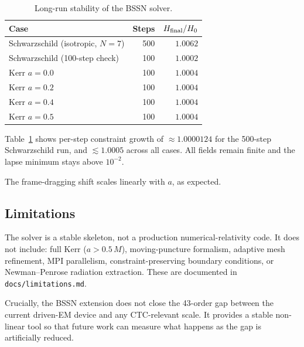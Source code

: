 \begin{table}[h]
\centering
\caption{Long-run stability of the BSSN solver.}
\label{tab:bssn}
\begin{tabular}{lrr}
\hline
Case & Steps & $H_{\rm final}/H_0$ \\
\hline
Schwarzschild (isotropic, $N{=}7$) & 500 & $1.0062$ \\
Schwarzschild (100-step check)      & 100 & $1.0002$ \\
Kerr $a{=}0.0$                       & 100 & $1.0004$ \\
Kerr $a{=}0.2$                       & 100 & $1.0004$ \\
Kerr $a{=}0.4$                       & 100 & $1.0004$ \\
Kerr $a{=}0.5$                       & 100 & $1.0004$ \\
\hline
\end{tabular}
\end{table}

Table~\ref{tab:bssn} shows per-step constraint growth of
$\approx 1.0000124$ for the 500-step Schwarzschild run, and
$\lesssim 1.0005$ across all cases. All fields remain finite and the
lapse minimum stays above $10^{-2}$.

The frame-dragging shift scales linearly with $a$, as expected.

\subsection{Limitations}

The solver is a stable skeleton, not a production numerical-relativity
code. It does not include: full Kerr ($a > 0.5\,M$), moving-puncture
formalism, adaptive mesh refinement, MPI parallelism,
constraint-preserving boundary conditions, or Newman--Penrose radiation
extraction. These are documented in \texttt{docs/limitations.md}.

Crucially, the BSSN extension does not close the 43-order gap between
the current driven-EM device and any CTC-relevant scale. It provides a
stable non-linear tool so that future work can measure what happens
as the gap is artificially reduced.
